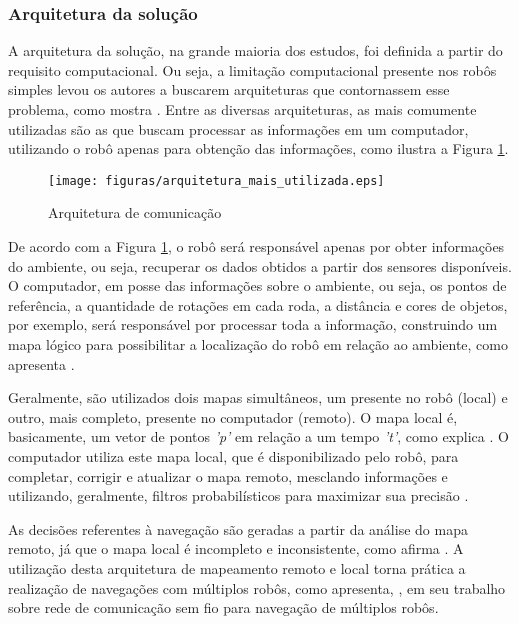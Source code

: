 		\subsubsection{Arquitetura da solução}
		\label{sub:arquitetura_solucao}

			A arquitetura da solução, na grande maioria dos estudos, foi definida a partir do requisito computacional. Ou seja, a limitação computacional presente nos robôs simples levou os autores a buscarem arquiteturas que contornassem esse problema, como mostra \cite{redeComunicacaoIndustria}. Entre as diversas arquiteturas, as mais comumente utilizadas são as que buscam processar as informações em um computador, utilizando o robô apenas para obtenção das informações, como ilustra a Figura \ref{img:arquitetura_mais_utilizada}.

			\begin{figure}[H]
				\centering
				\texttt{[image: figuras/arquitetura\_mais\_utilizada.eps]}
				\caption[Arquitetura de comunicação]{Arquitetura de comunicação}
				\label{img:arquitetura_mais_utilizada}
			\end{figure}

			De acordo com a Figura \ref{img:arquitetura_mais_utilizada}, o robô será responsável apenas por obter informações do ambiente, ou seja, recuperar os dados obtidos a partir dos sensores disponíveis. O computador, em posse das informações sobre o ambiente, ou seja, os pontos de referência, a quantidade de rotações em cada roda, a distância e cores de objetos, por exemplo, será responsável por processar toda a informação, construindo um mapa lógico para possibilitar a localização do robô em relação ao ambiente, como apresenta \cite{redeComunicacaoIndustria}.

			Geralmente, são utilizados dois mapas simultâneos, um presente no robô (local) e outro, mais completo, presente no computador (remoto). O mapa local é, basicamente, um vetor de pontos \textit{'p'} em relação a um tempo \textit{'t'}, como explica \cite{circumventingAssociationSLAM}. O computador utiliza este mapa local, que é disponibilizado pelo robô, para completar, corrigir e atualizar o mapa remoto, mesclando informações e utilizando, geralmente, filtros probabilísticos para maximizar sua precisão \cite{localizacaoEMapeamentoPaulo}.

			As decisões referentes à navegação são geradas a partir da análise do mapa remoto, já que o mapa local é incompleto e inconsistente, como afirma \cite{redeComunicacaoIndustria}. A utilização desta arquitetura de mapeamento remoto e local torna prática a realização de navegações com múltiplos robôs, como apresenta, \cite{redeComunicacaoIndustria}, em seu trabalho sobre rede de comunicação sem fio para navegação de múltiplos robôs.


